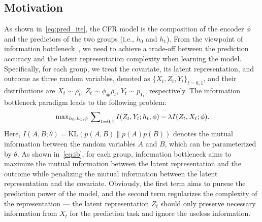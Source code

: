 \documentclass{article}
\begin{document}
\subsection{Motivation}
As shown in~\eqref{eq:pred_ite}, the CFR model is the composition of the encoder $\phi$ and the predictors of the two groups (i.e., $h_0$ and $h_1$). 
From the viewpoint of information bottleneck~\cite{tishby1999information}, we need to achieve a trade-off between the prediction accuracy and the latent representation complexity when learning the model. 
Specifically, for each group, we treat the covariate, its latent representation, and outcome as three random variables, denoted as $\{X_t, Z_t, Y_t\}_{t=0,1}$, and their distributions are $X_t\sim\rho_t$, $Z_t\sim\phi_{\#}\rho_t$, $Y_t\sim p_{Y_t}$, respectively.
The information bottleneck paradigm leads to the following problem:
\begin{eqnarray}\label{eq:ib}
    \sideset{}{_{h_0,h_1,\phi}}\max \sideset{}{_{t=0,1}}\sum I(Z_t, Y_t;h_t,\phi) -\lambda I(Z_t, X_t;\phi).
\end{eqnarray}
Here, $I(A, B;\theta)=\text{KL}(p(A,B)\|p(A)p(B))$ denotes the mutual information between the random variables $A$ and $B$, which can be parameterized by $\theta$.
As shown in~\eqref{eq:ib}, for each group, information bottleneck aims to maximize the mutual information between the latent representation  and the outcome while penalizing the mutual information between the latent representation and the covariate. 
Obviously, the first term aims to pursue the prediction power of the model, and the second term regularizes the complexity of the representation --- the latent representation $Z_t$ should only preserve necessary information from $X_t$ for the prediction task and ignore the useless information.
\end{document}
